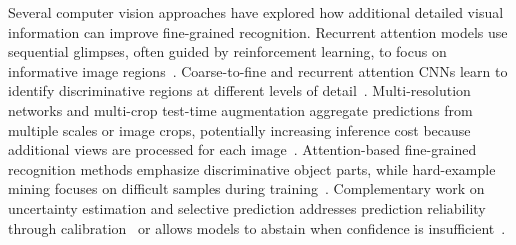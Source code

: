 \documentclass[final,3p,times,twocolumn]{elsarticle}
\begin{document}
Several computer vision approaches have explored how additional detailed visual information can improve fine-grained recognition. Recurrent attention models use sequential glimpses, often guided by reinforcement learning, to focus on informative image regions~\citep{mnih2014recurrent}. Coarse-to-fine and recurrent attention CNNs learn to identify discriminative regions at different levels of detail~\citep{fu2017look}. Multi-resolution networks and multi-crop test-time augmentation aggregate predictions from multiple scales or image crops, potentially increasing inference cost because additional views are processed for each image~\citep{krizhevsky2012imagenet, huang2018multiscale}. Attention-based fine-grained recognition methods emphasize discriminative object parts, while hard-example mining focuses on difficult samples during training~\citep{fu2017look, shrivastava2016training}. Complementary work on uncertainty estimation and selective prediction addresses prediction reliability through calibration~\citep{Guoetal2017, Ovadiaetal2019, hendrycks2017baseline} or allows models to abstain when confidence is insufficient~\citep{geifman2017selective}. 
\end{document}
